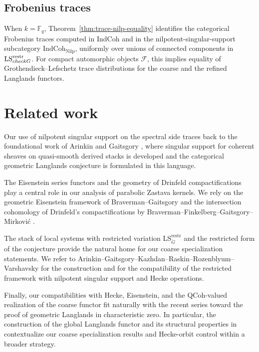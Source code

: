 \documentclass[11pt]{article}
\newcommand{\IndCoh}{\mathrm{IndCoh}}
\newcommand{\Nilp}{\mathrm{Nilp}}
\newcommand{\LS}{\mathrm{LS}}
\newcommand{\restr}{\mathrm{restr}}
\newcommand{\cF}{\mathcal{F}}
\theoremstyle{plain}
\theoremstyle{definition}
\theoremstyle{remark}
\begin{document}
\subsection{Frobenius traces}
When $k=\mathbb F_q$, Theorem~\ref{thm:trace-nilp-equality} identifies the categorical Frobenius traces computed in $\IndCoh$ and in the nilpotent-singu\-lar-support subcategory $\IndCoh_{\Nilp}$, uniformly over unions of connected components in $\LS^{\restr}_{\\check G}$. For compact automorphic objects $\cF$, this implies equality of Grothendieck--Lefschetz trace distributions for the coarse and the refined Langlands functors.

\section{Related work}\label{sec:related}
Our use of nilpotent singular support on the spectral side traces back to the foundational work of Arinkin and Gaitsgory \cite{ArinkinGaitsgory2015-SingularSupport}, where singular support for coherent sheaves on quasi-smooth derived stacks is developed and the categorical geometric Langlands conjecture is formulated in this language. %

The Eisenstein series functors and the geometry of Drinfeld compactifications play a central role in our analysis of parabolic Zastava kernels. We rely on the geometric Eisenstein framework of Braverman--Gaitsgory \cite{BravermanGaitsgory2002-GeometricEisenstein} and the intersection cohomology of Drinfeld's compactifications by Braverman--Finkelberg--Gaitsgory--Mirkovi\'c \cite{BFGM2002-ICDrinfeld}. %

The stack of local systems with restricted variation $\LS^{\restr}_{\check G}$ and the restricted form of the conjecture provide the natural home for our coarse specialization statements. We refer to Arinkin--Gaitsgory--Kazhdan--Raskin--Rozenblyum--Varshavsky \cite{AGKRRV2020-RestrictedLocSys} for the construction and for the compatibility of the restricted framework with nilpotent singular support and Hecke operations. %

Finally, our compatibilities with Hecke, Eisenstein, and the QCoh-valued realization of the coarse functor fit naturally with the recent series toward the proof of geometric Langlands in characteristic zero. In particular, the construction of the global Langlands functor and its structural properties in \cite{GaitsgoryRaskin2024-GLFunctorI} contextualize our coarse specialization results and Hecke-orbit control within a broader strategy. %
\end{document}
